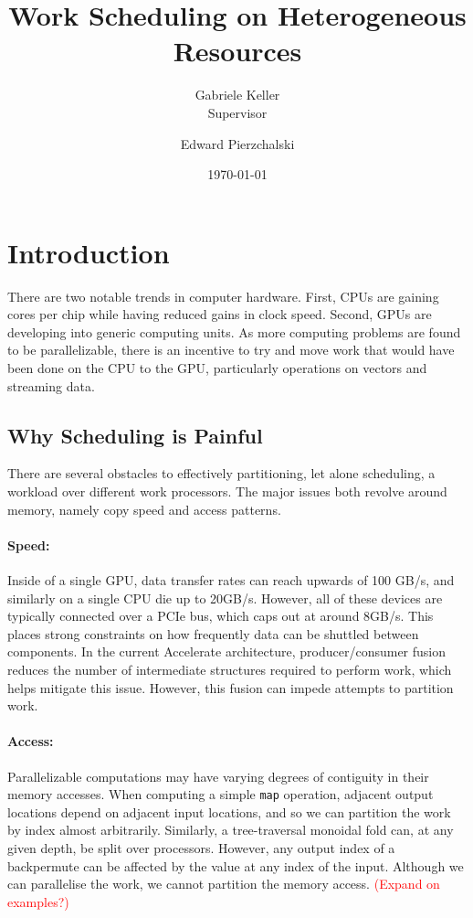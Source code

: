 \documentclass[a4paper,12pt]{article}
\title{Work Scheduling on Heterogeneous Resources}
\date{\today}
\author{Gabriele Keller\\\small{Supervisor} \and Edward 
Pierzchalski}
\newcommand{\red}[1]{\textcolor{red}{#1}}
\begin{document}
\begin{titlepage}

\cleardoublepage
\maketitle
\thispagestyle{empty}

\end{titlepage}

\section{Introduction}

There are two notable trends in computer hardware. 
First, CPUs are gaining cores per chip while having reduced gains in clock speed. Second, GPUs are developing into generic computing units. 
As more computing problems are found to be parallelizable, there is an incentive to try and move work that would have been done on the CPU to the GPU, particularly operations on vectors and streaming data.

\subsection{Why Scheduling is Painful}

There are several obstacles to effectively partitioning, let alone scheduling, a workload over different work processors. The major issues both revolve around memory, namely copy speed and access patterns. 

\paragraph*{Speed:} Inside of a single GPU, data transfer rates can reach upwards of 100 GB/s, and similarly on a single CPU die up to 20GB/s. However, all of these devices are typically connected over a PCIe bus, which caps out at around 8GB/s. This places strong constraints on how frequently data can be shuttled between components. In the current Accelerate architecture, producer/consumer fusion reduces the number of intermediate structures required to perform work, which helps mitigate this issue. However, this fusion can impede attempts to partition work.

\paragraph*{Access:} Parallelizable computations may have varying degrees of contiguity in their memory accesses. When computing a simple \texttt{map} operation, adjacent output locations depend on adjacent input locations, and so we can partition the work by index almost arbitrarily. Similarly, a tree-traversal monoidal fold can, at any given depth, be split over processors. However, any output index of a backpermute can be affected by the value at any index of the input. Although we can parallelise the work, we cannot partition the memory access. \red{(Expand on examples?)}
\end{document}

